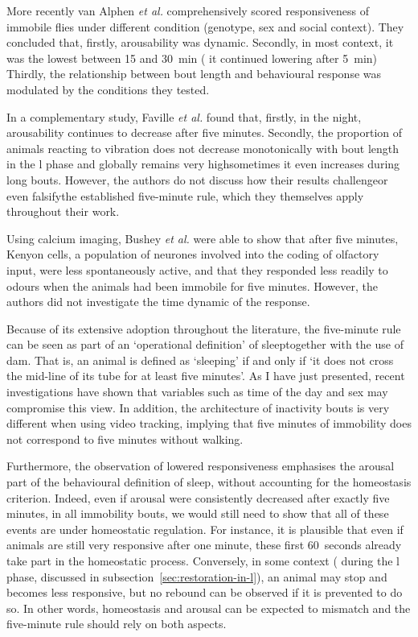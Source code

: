 More recently van Alphen \emph{et al.} comprehensively scored responsiveness of immobile flies under different condition (genotype, sex and social context)\cite{van_alphen_dynamic_2013}. 
They concluded that, firstly, arousability was dynamic.
Secondly, in most context, it was the lowest between 15 and 30~min (\ie{} it continued lowering after 5~min)
Thirdly, the relationship between bout length and behavioural response was modulated by the conditions they tested. 

In a complementary study, Faville \emph{et al.} found that, firstly, in the night, arousability continues to decrease after five minutes\cite{faville_how_2015}.
Secondly, the proportion of animals reacting to vibration does not decrease monotonically with bout length 
in the \gls{l} phase and globally remains very high\emd{}sometimes it even increases during long bouts.
However, the authors do not discuss how their results challenge\emd{}or even falsify\emd{}the established five-minute rule, which they themselves  apply throughout their work.

Using calcium imaging, Bushey \emph{et al.} were able to show that after five minutes,
Kenyon cells, a population of neurones involved into the coding of olfactory input, were less spontaneously active, and that they responded less readily to odours when the animals had been immobile for five minutes. However, the authors did not investigate the time dynamic of the response\cite{bushey_sleep-_2015}.

Because of its extensive adoption throughout the literature, the five-minute rule can be seen as part of an `operational definition' of sleep\emd{}together with the use of \gls{dam}.
That is, an animal is defined as `sleeping' if and only if `it does not cross the mid-line of its tube for at least five minutes'.
As I have just presented, recent investigations have shown that variables such as time of the day and sex may compromise this view\cite{faville_how_2015}. 
In addition, the architecture of inactivity bouts is very different when using video tracking, implying that five minutes of immobility does not correspond to five minutes without walking.

Furthermore, the observation of lowered responsiveness emphasises the arousal part of the behavioural definition of sleep, without accounting for the homeostasis criterion. 
Indeed, even if arousal were consistently decreased after exactly five minutes, in all immobility bouts,
we would still need to show that all of these events are under homeostatic regulation.
For instance, it is plausible that even if animals are still very responsive after one minute, these first 60~seconds already take part in the homeostatic process.
Conversely, in some context (\eg{} during the \gls{l} phase, discussed in subsection~\ref{sec:restoration-in-l}), an animal may stop and becomes less responsive, but no rebound can be observed if it is prevented to do so.
In other words, homeostasis and arousal can be expected to mismatch and the five-minute rule should rely on both aspects.

